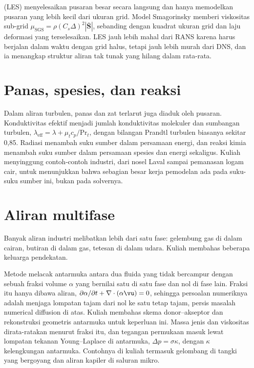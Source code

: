  (LES) menyelesaikan pusaran besar secara langsung dan hanya memodelkan
pusaran yang lebih kecil dari ukuran grid. Model Smagorinsky \citep{smagorinsky1963} memberi viskositas
sub-grid $\mu_{\mathrm{SGS}}=\rho(C_s\Delta)^2|\bar{\bm S}|$, sebanding dengan kuadrat ukuran grid dan
laju deformasi yang terselesaikan. LES jauh lebih mahal dari RANS karena harus berjalan dalam waktu
dengan grid halus, tetapi jauh lebih murah dari DNS, dan ia menangkap struktur aliran tak tunak
yang hilang dalam rata-rata.

\section{Panas, spesies, dan reaksi}

Dalam aliran turbulen, panas dan zat terlarut juga diaduk oleh pusaran. Konduktivitas efektif
menjadi jumlah konduktivitas molekuler dan sumbangan turbulen,
$\lambda_{\mathrm{eff}}=\lambda+\mu_tc_p/\mathrm{Pr}_t$, dengan bilangan Prandtl turbulen biasanya sekitar
0,85. Radiasi menambah suku sumber dalam persamaan energi, dan reaksi kimia menambah suku sumber
dalam persamaan spesies dan energi sekaligus. Kuliah menyinggung contoh-contoh industri, dari nosel
Laval sampai pemanasan logam cair, untuk menunjukkan bahwa sebagian besar kerja pemodelan ada pada
suku-suku sumber ini, bukan pada solvernya.

\section{Aliran multifase}

Banyak aliran industri melibatkan lebih dari satu fase: gelembung gas di dalam cairan, butiran di
dalam gas, tetesan di dalam udara. Kuliah membahas beberapa keluarga pendekatan.

Metode  \citep{hirt1981} melacak antarmuka antara dua fluida yang tidak
bercampur dengan sebuah fraksi volume $\alpha$ yang bernilai satu di satu fase dan nol di fase lain. Fraksi
itu hanya dibawa aliran, $\partial\alpha/\partial t+\nabla\cdot(\alpha\vu)=0$, sehingga persoalan numeriknya
adalah menjaga lompatan tajam dari nol ke satu tetap tajam, persis masalah numerical diffusion di atas. Kuliah
membahas skema donor--akseptor dan rekonstruksi geometris antarmuka untuk keperluan ini. Massa jenis
dan viskositas dirata-ratakan menurut fraksi itu, dan tegangan permukaan masuk lewat lompatan
tekanan Young--Laplace di antarmuka, $\Delta p=\sigma\kappa$, dengan $\kappa$ kelengkungan antarmuka.
Contohnya di kuliah termasuk gelombang di tangki yang bergoyang dan aliran kapiler di saluran mikro.

